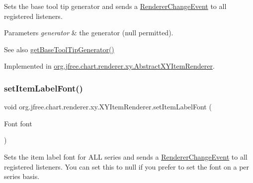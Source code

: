 Sets the base tool tip generator and sends a \mbox{\hyperlink{}{Renderer\+Change\+Event}} to all registered listeners.


\begin{DoxyParams}{Parameters}
{\em generator} & the generator ({\ttfamily null} permitted).\\
\hline
\end{DoxyParams}
\begin{DoxySeeAlso}{See also}
\mbox{\hyperlink{interfaceorg_1_1jfree_1_1chart_1_1renderer_1_1xy_1_1_x_y_item_renderer_ad56671cc8a9a90acdf7eae3339a0d068}{get\+Base\+Tool\+Tip\+Generator()}} 
\end{DoxySeeAlso}


Implemented in \mbox{\hyperlink{classorg_1_1jfree_1_1chart_1_1renderer_1_1xy_1_1_abstract_x_y_item_renderer_aff6e3670d0799d590158695fe311a337}{org.\+jfree.\+chart.\+renderer.\+xy.\+Abstract\+X\+Y\+Item\+Renderer}}.

\mbox{\label{interfaceorg_1_1jfree_1_1chart_1_1renderer_1_1xy_1_1_x_y_item_renderer_afcd882e3d1ff5110045a614474cf4197}} 
\subsubsection{\texorpdfstring{set\+Item\+Label\+Font()}{setItemLabelFont()}}
{\footnotesize\ttfamily void org.\+jfree.\+chart.\+renderer.\+xy.\+X\+Y\+Item\+Renderer.\+set\+Item\+Label\+Font (\begin{DoxyParamCaption}\item[{Font}]{font }\end{DoxyParamCaption})}

Sets the item label font for A\+LL series and sends a \mbox{\hyperlink{}{Renderer\+Change\+Event}} to all registered listeners. You can set this to {\ttfamily null} if you prefer to set the font on a per series basis.


